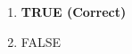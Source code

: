 \documentclass[letterpaper,9pt,twoside,printwatermark=false]{pinp}
\providecommand{\tightlist}{%
  \setlength{\itemsep}{0pt}\setlength{\parskip}{0pt}}
\begin{document}
\begin{enumerate}
\def\labelenumi{\alph{enumi}.}
\tightlist
\item
  \textbf{TRUE (Correct)}
\item
  FALSE
\end{enumerate}





\end{document}
